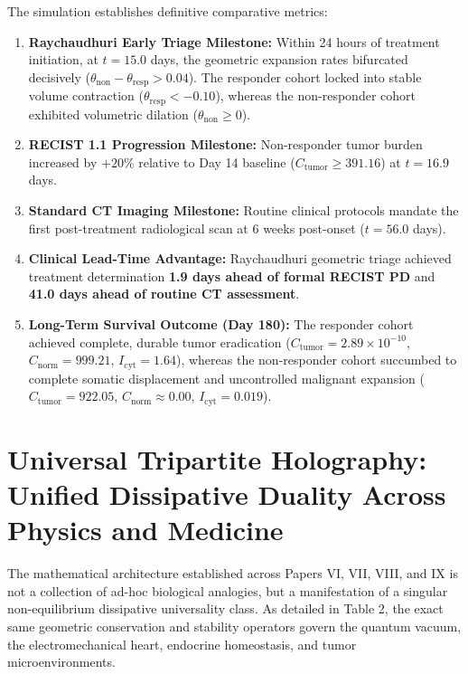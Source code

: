 \documentclass[11pt,a4paper]{article}
\begin{document}
The simulation establishes definitive comparative metrics:
\begin{enumerate}
    \item \textbf{Raychaudhuri Early Triage Milestone:} Within 24 hours of treatment initiation, at $t = 15.0$ days, the geometric expansion rates bifurcated decisively ($\theta_{\mathrm{non}} - \theta_{\mathrm{resp}} > 0.04$). The responder cohort locked into stable volume contraction ($\theta_{\mathrm{resp}} < -0.10$), whereas the non-responder cohort exhibited volumetric dilation ($\theta_{\mathrm{non}} \ge 0$).
    \item \textbf{RECIST 1.1 Progression Milestone:} Non-responder tumor burden increased by $+20\%$ relative to Day 14 baseline ($C_{\mathrm{tumor}} \ge 391.16$) at $t = 16.9$ days.
    \item \textbf{Standard CT Imaging Milestone:} Routine clinical protocols mandate the first post-treatment radiological scan at 6 weeks post-onset ($t = 56.0$ days).
    \item \textbf{Clinical Lead-Time Advantage:} Raychaudhuri geometric triage achieved treatment determination \textbf{1.9 days ahead of formal RECIST PD} and \textbf{41.0 days ahead of routine CT assessment}.
    \item \textbf{Long-Term Survival Outcome (Day 180):} The responder cohort achieved complete, durable tumor eradication ($C_{\mathrm{tumor}} = 2.89 \times 10^{-10}$, $C_{\mathrm{norm}} = 999.21$, $I_{\mathrm{cyt}} = 1.64$), whereas the non-responder cohort succumbed to complete somatic displacement and uncontrolled malignant expansion ($C_{\mathrm{tumor}} = 922.05$, $C_{\mathrm{norm}} \approx 0.00$, $I_{\mathrm{cyt}} = 0.019$).
\end{enumerate}

\section{Universal Tripartite Holography: Unified Dissipative Duality Across Physics and Medicine}

The mathematical architecture established across Papers VI, VII, VIII, and IX is not a collection of ad-hoc biological analogies, but a manifestation of a singular non-equilibrium dissipative universality class. As detailed in Table 2, the exact same geometric conservation and stability operators govern the quantum vacuum, the electromechanical heart, endocrine homeostasis, and tumor microenvironments.
\end{document}
